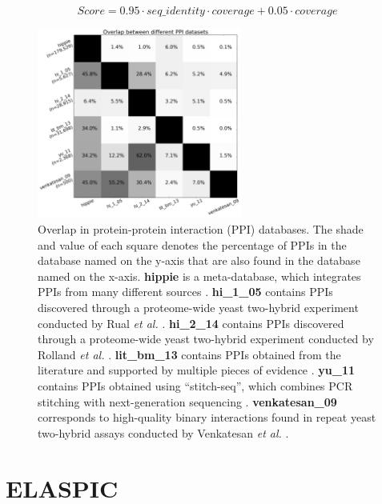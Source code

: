 \begin{equation} \label{eq:alignment_score}
	Score = 0.95 \cdot seq\_identity \cdot coverage + 0.05 \cdot coverage
\end{equation}

\begin{figure}[!tb]
	\centering
	\includegraphics[width=0.6\textwidth]{static/profs/ppi_database_overlap.png}
	\caption[Overlap in protein-protein interaction databases.]{Overlap in protein-protein interaction (PPI) databases. The shade and value of each square denotes the percentage of PPIs in the database named on the y-axis that are also found in the database named on the x-axis. \textbf{hippie} is a meta-database, which integrates PPIs from many different sources \cite{schaefer_hippie:_2012}. \textbf{hi\_1\_05} contains PPIs discovered through a proteome-wide yeast two-hybrid experiment conducted by Rual \textit{et al.} \cite{rual_towards_2005}. \textbf{hi\_2\_14} contains PPIs discovered through a proteome-wide yeast two-hybrid experiment conducted by Rolland \textit{et al.} \cite{rolland_proteome-scale_2014}. \textbf{lit\_bm\_13} contains PPIs obtained from the literature and supported by multiple pieces of evidence \cite{rolland_proteome-scale_2014}. \textbf{yu\_11} contains PPIs obtained using ``stitch-seq'', which combines PCR stitching with next-generation sequencing \cite{yu_next-generation_2011}. \textbf{venkatesan\_09} corresponds to high-quality binary interactions found in repeat yeast two-hybrid assays conducted by Venkatesan \textit{et al.} \cite{venkatesan_empirical_2009}.}
	\label{fig:ppi_database_overlap}
\end{figure}



\clearpage
\section{ELASPIC}

